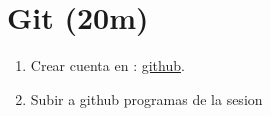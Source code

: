 \documentclass{beamer}
\begin{document}
\section{Git (20m) }

\begin{frame}

\begin{enumerate}
\item
	Crear cuenta en : \href{https://github.com}{github}.

    
\item
	Subir a github programas de la sesion


\end{enumerate} 


\end{frame}
\end{document}
